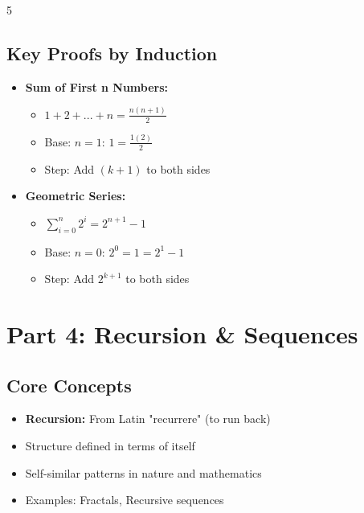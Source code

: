 \documentclass[a4paper,landscape]{article}
\begin{document}
\begin{multicols*}{5}
\subsection*{Key Proofs by Induction}
\begin{itemize}[leftmargin=*, itemsep=0pt]
    \item \textbf{Sum of First n Numbers:}
    \begin{itemize}[leftmargin=*, itemsep=0pt]
        \item $1 + 2 + ... + n = \frac{n(n+1)}{2}$
        \item Base: $n=1$: $1 = \frac{1(2)}{2}$
        \item Step: Add $(k+1)$ to both sides
    \end{itemize}
    \item \textbf{Geometric Series:}
    \begin{itemize}[leftmargin=*, itemsep=0pt]
        \item $\sum_{i=0}^n 2^i = 2^{n+1} - 1$
        \item Base: $n=0$: $2^0 = 1 = 2^1 - 1$
        \item Step: Add $2^{k+1}$ to both sides
    \end{itemize}
\end{itemize}

\section*{Part 4: Recursion \& Sequences}

\subsection*{Core Concepts}
\begin{itemize}[leftmargin=*, itemsep=0pt]
    \item \textbf{Recursion:} From Latin "recurrere" (to run back)
    \item Structure defined in terms of itself
    \item Self-similar patterns in nature and mathematics
    \item Examples: Fractals, Recursive sequences
\end{itemize}


\end{multicols*}
\end{document}
